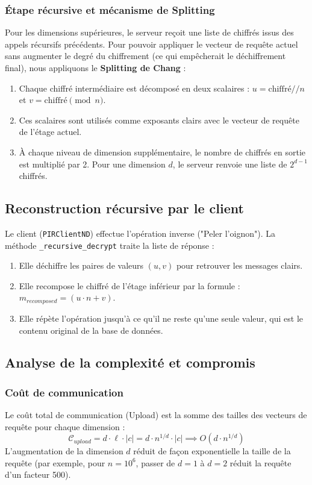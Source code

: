 \documentclass[12pt,a4paper]{report}
\begin{document}
\subsubsection{Étape récursive et mécanisme de Splitting}
Pour les dimensions supérieures, le serveur reçoit une liste de chiffrés issus des appels récursifs précédents. Pour pouvoir appliquer le vecteur de requête actuel sans augmenter le degré du chiffrement (ce qui empêcherait le déchiffrement final), nous appliquons le \textbf{Splitting de Chang} :
\begin{enumerate}
    \item Chaque chiffré intermédiaire est décomposé en deux scalaires : $u = \text{chiffré} // n$ et $v = \text{chiffré} \pmod n$.
    \item Ces scalaires sont utilisés comme exposants clairs avec le vecteur de requête de l'étage actuel.
    \item À chaque niveau de dimension supplémentaire, le nombre de chiffrés en sortie est multiplié par 2. Pour une dimension $d$, le serveur renvoie une liste de $2^{d-1}$ chiffrés.
\end{enumerate}

\subsection{Reconstruction récursive par le client}
Le client (\texttt{PIRClientND}) effectue l'opération inverse ("Peler l'oignon"). La méthode \texttt{\_recursive\_decrypt} traite la liste de réponse :
\begin{enumerate}
    \item Elle déchiffre les paires de valeurs $(u, v)$ pour retrouver les messages clairs.
    \item Elle recompose le chiffré de l'étage inférieur par la formule : $m_{recomposed} = (u \cdot n + v)$.
    \item Elle répète l'opération jusqu'à ce qu'il ne reste qu'une seule valeur, qui est le contenu original de la base de données.
\end{enumerate}

\subsection{Analyse de la complexité et compromis}

\subsubsection{Coût de communication}
Le coût total de communication (Upload) est la somme des tailles des vecteurs de requête pour chaque dimension :
\[ \mathcal{C}_{upload} = d \cdot \ell \cdot |c| = d \cdot n^{1/d} \cdot |c| \implies O(d \cdot n^{1/d}) \]
L'augmentation de la dimension $d$ réduit de façon exponentielle la taille de la requête (par exemple, pour $n=10^6$, passer de $d=1$ à $d=2$ réduit la requête d'un facteur 500).
\end{document}

